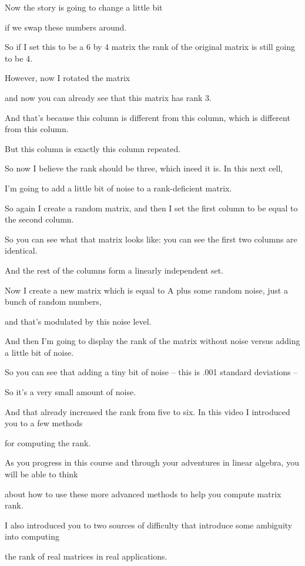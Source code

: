 \documentclass[fleqn,10pt]{olplainarticle}
\theoremstyle{definition}
\theoremstyle{remark}
\begin{document}
Now the story is going to change a little bit

if we swap these numbers around.

So if I set this to be a 6 by 4 matrix the rank of the original matrix is still going to be 4.

However, now I rotated the matrix

and now you can already see that this matrix has rank 3.

And that's because this column is different from this column, which is different from this column.

But this column is exactly this column repeated.

So now I believe the rank should be three, which ineed it is. In this next cell,

I'm going to add a little bit of noise to a rank-deficient matrix.

So again I create a random matrix, and then I set the first column to be equal to the second column.

So you can see what that matrix looks like: you can see the first two columns are identical.

And the rest of the columns form a linearly independent set.

Now I create a new matrix which is equal to A plus some random noise, just a bunch of random numbers,

and that's modulated by this noise level.

And then I'm going to display the rank of the matrix without noise versus adding a little bit of noise.

So you can see that adding a tiny bit of noise -- this is .001 standard deviations --

So it's a very small amount of noise.

And that already increased the rank from five to six. In this video I introduced you to a few methods

for computing the rank.

As you progress in this course and through your adventures in linear algebra, you will be able to think

about how to use these more advanced methods to help you compute matrix rank.

I also introduced you to two sources of difficulty that introduce some ambiguity into computing

the rank of real matrices in real applications.
\end{document}
